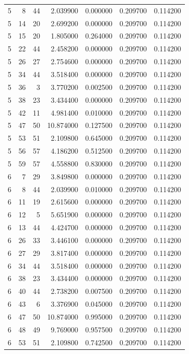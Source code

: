 \begin{table}
\begin{tabular}{rrrrrrr}
5 & 8 & 44 & 2.039900 & 0.000000 & 0.209700 & 0.114200 \\
5 & 14 & 20 & 2.699200 & 0.000000 & 0.209700 & 0.114200 \\
5 & 15 & 20 & 1.805000 & 0.264000 & 0.209700 & 0.114200 \\
5 & 22 & 44 & 2.458200 & 0.000000 & 0.209700 & 0.114200 \\
5 & 26 & 27 & 2.754600 & 0.000000 & 0.209700 & 0.114200 \\
5 & 34 & 44 & 3.518400 & 0.000000 & 0.209700 & 0.114200 \\
5 & 36 & 3 & 3.770200 & 0.002500 & 0.209700 & 0.114200 \\
5 & 38 & 23 & 3.434400 & 0.000000 & 0.209700 & 0.114200 \\
5 & 42 & 11 & 4.981400 & 0.010000 & 0.209700 & 0.114200 \\
5 & 47 & 50 & 10.874000 & 0.127500 & 0.209700 & 0.114200 \\
5 & 53 & 51 & 2.109800 & 0.645000 & 0.209700 & 0.114200 \\
5 & 56 & 57 & 4.186200 & 0.512500 & 0.209700 & 0.114200 \\
5 & 59 & 57 & 4.558800 & 0.830000 & 0.209700 & 0.114200 \\
6 & 7 & 29 & 3.849800 & 0.000000 & 0.209700 & 0.114200 \\
6 & 8 & 44 & 2.039900 & 0.010000 & 0.209700 & 0.114200 \\
6 & 11 & 19 & 2.615600 & 0.000000 & 0.209700 & 0.114200 \\
6 & 12 & 5 & 5.651900 & 0.000000 & 0.209700 & 0.114200 \\
6 & 13 & 44 & 4.424700 & 0.000000 & 0.209700 & 0.114200 \\
6 & 26 & 33 & 3.446100 & 0.000000 & 0.209700 & 0.114200 \\
6 & 27 & 29 & 3.817400 & 0.000000 & 0.209700 & 0.114200 \\
6 & 34 & 44 & 3.518400 & 0.000000 & 0.209700 & 0.114200 \\
6 & 38 & 23 & 3.434400 & 0.000000 & 0.209700 & 0.114200 \\
6 & 40 & 44 & 2.738200 & 0.007500 & 0.209700 & 0.114200 \\
6 & 43 & 6 & 3.376900 & 0.045000 & 0.209700 & 0.114200 \\
6 & 47 & 50 & 10.874000 & 0.995000 & 0.209700 & 0.114200 \\
6 & 48 & 49 & 9.769000 & 0.957500 & 0.209700 & 0.114200 \\
6 & 53 & 51 & 2.109800 & 0.742500 & 0.209700 & 0.114200 \\

\end{tabular}
\end{table}
